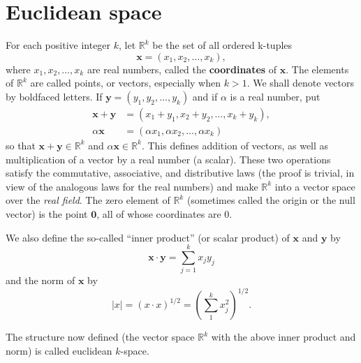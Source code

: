 \section{Euclidean space}

\begin{myDef}
    \label{myDef:1.36 coordinates}
    For each positive integer $k$, let $\mathbb{R}^k$ be the set of all ordered k-tuples
    \begin{equation*}
        \mathbf{x} = \left(x_1,x_2,\dots,x_k\right),
    \end{equation*}
    where $x_1,x_2,\dots,x_k$ are real numbers, called the \textbf{coordinates} of $\mathbf{x}$. The elements of
    $\mathbb{R}^k$ are called points, or vectors, especially when $k > 1$. We shall denote vectors
    by boldfaced letters. 
    If $\mathbf{y} = \left(y_1,y_2,\dots,y_k\right)$ and if $\alpha$ is a real number, put
    \begin{align*}
        \mathbf{x} + \mathbf{y} &= \left(x_1+y_1,x_2+y_2,\dots,x_k+y_k\right),\\
        \alpha\mathbf{x}  &= \left(\alpha x_1,\alpha x_2,\dots,\alpha x_k\right)
    \end{align*}
    so that $\mathbf{x} +\mathbf{y} \in \mathbb{R}^k$ and $\alpha\mathbf{x} \in \mathbb{R}^k$. This defines addition of vectors, as well as multiplication of a vector by a real number (a scalar). These two operations satisfy the commutative, associative, and distributive laws (the proof is trivial, in view of the analogous laws for the real numbers) and make $\mathbb{R}^k$ into a vector space over the \emph{real field}. The zero element of $\mathbb{R}^k$ (sometimes called the origin or the null vector) is the point $\mathbf{0}$, all of whose coordinates are $0$.

    We also define the so-called ``inner product'' (or scalar product) of $\mathbf{x}$ and $\mathbf{y}$ by
    \begin{equation*}
        \mathbf{x}\cdot\mathbf{y} = \sum_{j=1}^{k}x_j y_j
    \end{equation*}
    and the norm of $\mathbf{x}$ by
    \begin{equation*}
        |x| = (x\cdot x)^{1/2} = \left( \sum_{1}^{k} x_j^2 \right)^{1/2}.
    \end{equation*}

    The structure now defined (the vector space $\mathbb{R}^k$ with the above inner product and norm) is called euclidean $k$-space.
\end{myDef}

